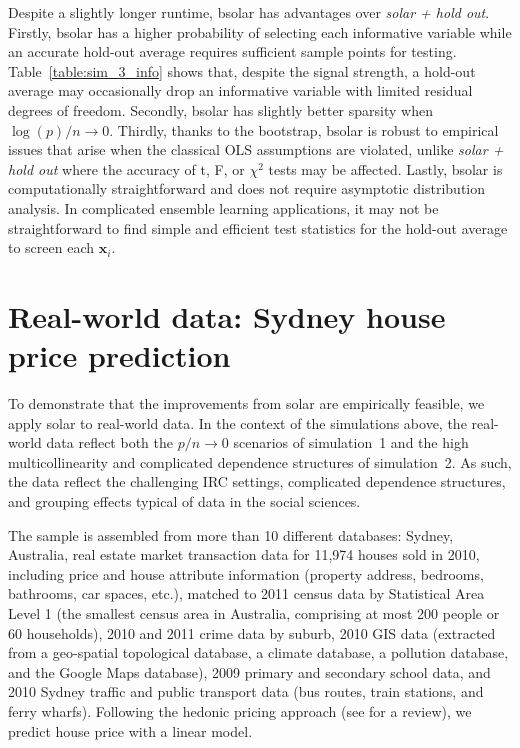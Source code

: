 \documentclass[12pt]{article}
\begin{document}
Despite a slightly longer runtime, bsolar has advantages over \emph{solar + hold out}. Firstly, bsolar has a higher probability of selecting each informative variable while an accurate hold-out average requires sufficient sample points for testing. Table~\ref{table:sim_3_info} shows that, despite the signal strength, a hold-out average may occasionally drop an informative variable with limited residual degrees of freedom. Secondly, bsolar has slightly better sparsity when $\log(p)/n \rightarrow 0$. Thirdly, thanks to the bootstrap, bsolar is robust to empirical issues that arise when the classical OLS assumptions are violated, unlike \emph{solar + hold out} where the accuracy of t, F, or $\chi^2$ tests may be affected. Lastly, bsolar is computationally straightforward and does not require asymptotic distribution analysis. In complicated ensemble learning applications, it may not be straightforward to find simple and efficient test statistics for the hold-out average to screen each $\mathbf{x}_i$.

\section{Real-world data: Sydney house price prediction\label{section:application}}

To demonstrate that the improvements from solar are empirically feasible, we apply solar to real-world data. In the context of the simulations above, the real-world data reflect both the $p/n\rightarrow0$ scenarios of simulation~1 and the high multicollinearity and complicated dependence structures of simulation~2. As such, the data reflect the challenging IRC settings, complicated dependence structures, and grouping effects typical of data in the social sciences.

The sample is assembled from more than 10 different databases: Sydney, Australia, real estate market transaction data for 11,974 houses sold in 2010, including price and house attribute information (property address, bedrooms, bathrooms, car spaces, etc.), matched to 2011 census data by Statistical Area Level 1 (the smallest census area in Australia, comprising at most 200 people or 60 households), 2010 and 2011 crime data by suburb, 2010 GIS data (extracted from a geo-spatial topological database, a climate database, a pollution database, and the Google Maps database), 2009 primary and secondary school data, and 2010 Sydney traffic and public transport data (bus routes, train stations, and ferry wharfs). Following the hedonic pricing approach (see \citet{sirmans2005hedonic} for a review), we predict house price with a linear model.
\end{document}
